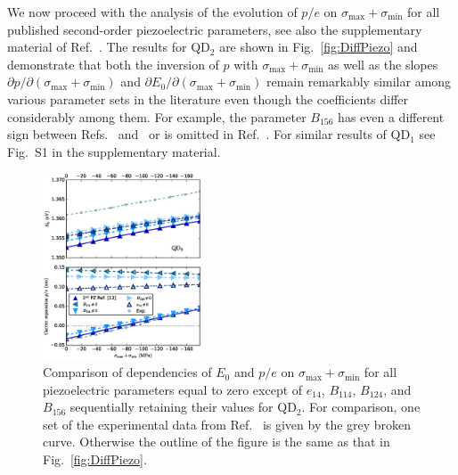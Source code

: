 \documentclass[aps,prl,amsmath,amssymb,twocolumn,showpacs,showkeys,superscriptaddress]{revtex4-1}
\begin{document}
We now proceed with the analysis of the evolution of $p/e$ on $\sigma_{\mathrm{max}}+\sigma_{\mathrm{min}}$ for all published second-order piezoelectric parameters, see also the supplementary material of Ref.~\cite{Aberl:17}. 
The results for QD$_2$ are shown in Fig.~\ref{fig:DiffPiezo} and demonstrate that both the inversion of $p$ with $\sigma_{\mathrm{max}}+\sigma_{\mathrm{min}}$ as well as the slopes $\partial p/\partial(\sigma_{\mathrm{max}}+\sigma_{\mathrm{min}})$ and $\partial E_0/\partial(\sigma_{\mathrm{max}}+\sigma_{\mathrm{min}})$ remain remarkably similar among various parameter sets in the literature even though the coefficients differ considerably among them.
For example, the parameter $B_{156}$ has even a different sign between Refs.~\cite{Bester:06} and~\cite{Beya-Wakata2011} or is omitted in Ref.~\cite{Tse2013}. For similar results of QD$_1$ see Fig.~S1 in the supplementary material.



\begin{figure}[!ht]
\begin{center}
\includegraphics[width=0.42\textwidth]{2018-02-05__171219_8x8_neotocena_++_nn+_35deg_pres350___40x20x3_piezo2ndorder_jednotlive_cleny.eps}
\end{center}
\caption{
Comparison of dependencies of $E_0$ and $p/e$ on $\sigma_{\mathrm{max}}+\sigma_{\mathrm{min}}$ for all piezoelectric parameters equal to zero except of $e_{14}$, $B_{114}$, $B_{124}$, and $B_{156}$ sequentially retaining their values for QD$_2$. For comparison, one set of the experimental data from Ref.~\cite{Aberl:17} is given by the grey broken curve. Otherwise the outline of the figure is the same as that in Fig.~\ref{fig:DiffPiezo}.
\label{fig:DiffPiezoCoeff}}
\end{figure}
\end{document}
